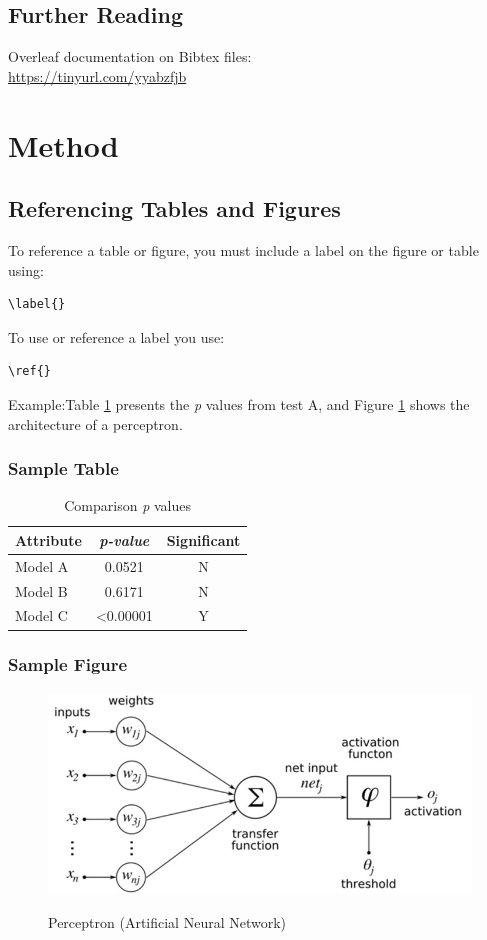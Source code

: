 \documentclass[12pt]{article}
\begin{document}
\subsection{Further Reading}
Overleaf documentation on Bibtex files: \\
\url{https://tinyurl.com/yyabzfjb}

\pagebreak




\section{Method}
\subsection{Referencing Tables and Figures}
To reference a table or figure, you must include a label on the figure or table using: 
\begin{verbatim}
\label{}  
\end{verbatim}
To use or reference a label you use:
\begin{verbatim}
\ref{}
\end{verbatim}
Example:Table \ref{tab:pvalues} presents the \textit{p} values from test A, and Figure \ref{lab:perceptron} shows the architecture of a perceptron.




\subsubsection{Sample Table}
\begin{table}[ht!]
\centering
    
	\caption{Comparison \textit{p} values}
	\begin{tabular}{ |l|c|c|}	
		\hline		
		\textbf{Attribute} & \textbf{\textit{p-value}} & \textbf{Significant} \\ \hline
		Model A	 & 0.0521 & N \\ \hline
		Model B  & 0.6171 & N \\ \hline 
		Model C  & <0.00001 & Y \\ \hline 
	\end{tabular}
	\label{tab:pvalues}
\end{table} 


\subsubsection{Sample Figure}
\begin{figure}[ht!]
 	\centering
 	\caption{Perceptron (Artificial Neural Network)}
 	\includegraphics[width=0.7\linewidth]{images/ANN.jpg}
 	\label{lab:perceptron}
 \end{figure}
 
\end{document}
